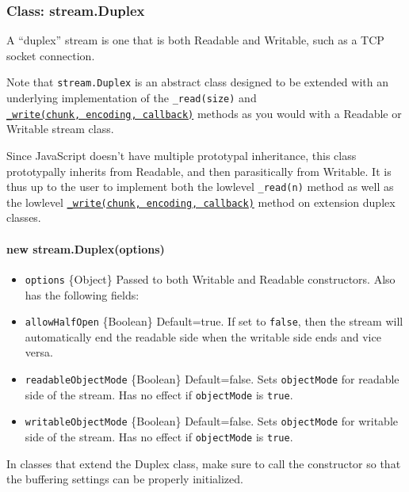 \subsubsection{Class: stream.Duplex}\label{class-stream.duplex-1}

A ``duplex'' stream is one that is both Readable and Writable, such as a
TCP socket connection.

Note that \texttt{stream.Duplex} is an abstract class designed to be
extended with an underlying implementation of the \texttt{\_read(size)}
and
\hyperref[streamux5fwritableux5fwriteux5fchunkux5fencodingux5fcallbackux5f1]{\texttt{\_write(chunk,\ encoding,\ callback)}}
methods as you would with a Readable or Writable stream class.

Since JavaScript doesn't have multiple prototypal inheritance, this
class prototypally inherits from Readable, and then parasitically from
Writable. It is thus up to the user to implement both the lowlevel
\texttt{\_read(n)} method as well as the lowlevel
\hyperref[streamux5fwritableux5fwriteux5fchunkux5fencodingux5fcallbackux5f1]{\texttt{\_write(chunk,\ encoding,\ callback)}}
method on extension duplex classes.

\paragraph{new stream.Duplex(options)}\label{new-stream.duplexoptions}

\begin{itemize}
\itemsep1pt\parskip0pt
\item
  \texttt{options} \{Object\} Passed to both Writable and Readable
  constructors. Also has the following fields:
\item
  \texttt{allowHalfOpen} \{Boolean\} Default=true. If set to
  \texttt{false}, then the stream will automatically end the readable
  side when the writable side ends and vice versa.
\item
  \texttt{readableObjectMode} \{Boolean\} Default=false. Sets
  \texttt{objectMode} for readable side of the stream. Has no effect if
  \texttt{objectMode} is \texttt{true}.
\item
  \texttt{writableObjectMode} \{Boolean\} Default=false. Sets
  \texttt{objectMode} for writable side of the stream. Has no effect if
  \texttt{objectMode} is \texttt{true}.
\end{itemize}

In classes that extend the Duplex class, make sure to call the
constructor so that the buffering settings can be properly initialized.

